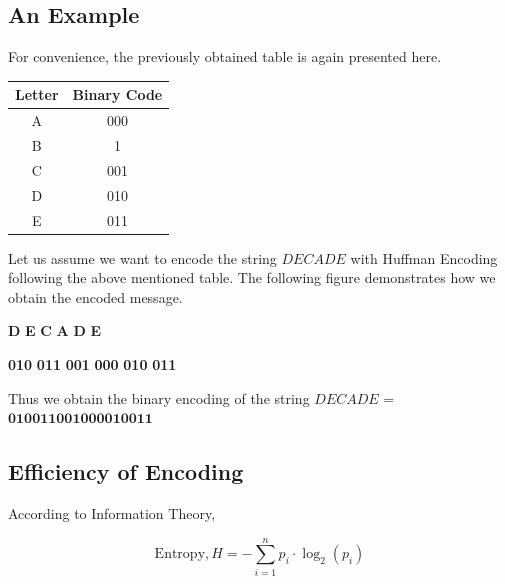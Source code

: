 \documentclass[18pt]{article}
\begin{document}
\subsection{An Example}

For convenience, the previously obtained table is again presented here.

\begin{table}[h]
	\centering
	\begin{tabular}{|c|c|}
		\hline
		\textbf{Letter} & \textbf{Binary Code} \\
		\hline
		A & 000  \\
		B & 1  \\
		C & 001 \\
		D & 010 \\
		E & 011 \\
		\hline
	\end{tabular}
\end{table}

Let us assume we want to encode the string $DECADE$ with Huffman Encoding following the above mentioned table. The following figure demonstrates how we obtain the encoded message.

\begin{center}
	\Large
	\textcolor{codecolorone}{\textbf{D}}
	\textcolor{codecolortwo}{\textbf{E}}
	\textcolor{codecolorone}{\textbf{C}}
	\textcolor{codecolortwo}{\textbf{A}}
	\textcolor{codecolorone}{\textbf{D}}
	\textcolor{codecolortwo}{\textbf{E}}
\end{center}

\begin{center}
	\huge
	\textcolor{codecolorone}{\textbf{010}}
	\textcolor{codecolortwo}{\textbf{011}}
	\textcolor{codecolorone}{\textbf{001}}
	\textcolor{codecolortwo}{\textbf{000}}
	\textcolor{codecolorone}{\textbf{010}}
	\textcolor{codecolortwo}{\textbf{011}}
\end{center}

Thus we obtain the binary encoding of the string $DECADE$ = $\textbf{010011001000010011}$

\subsection{Efficiency of Encoding}

According to Information Theory,

\[
\text{Entropy}, H = - \sum_{i=1}^{n} p_i \cdot \log_2(p_i)
\]
\end{document}
